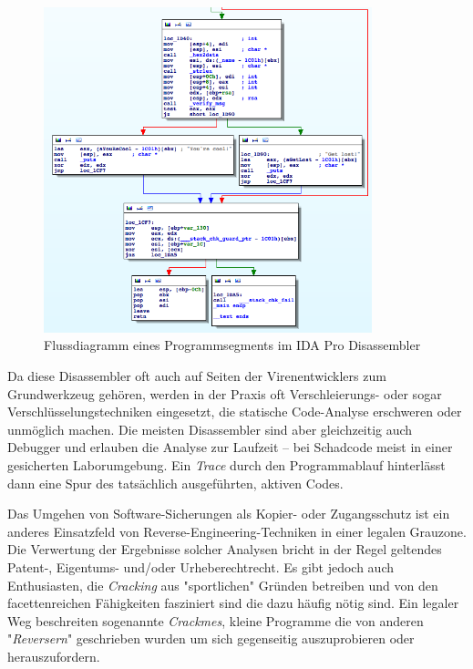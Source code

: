 \begin{figure}[h]
  \begin{center}
	\includegraphics[width=0.85\textwidth]{IDA-pro-flowdiagram.png}
  \end{center}
  \caption{Flussdiagramm eines Programmsegments im IDA Pro Disassembler}
\end{figure}

Da diese Disassembler oft auch auf Seiten der Virenentwicklers zum Grundwerkzeug gehören, werden in der Praxis oft Verschleierungs- oder sogar Verschlüsselungstechniken eingesetzt, die statische Code-Analyse erschweren oder unmöglich machen. Die meisten Disassembler sind aber gleichzeitig auch Debugger und erlauben die Analyse zur Laufzeit – bei Schadcode meist in einer gesicherten Laborumgebung. Ein \emph{Trace} durch den Programmablauf hinterlässt dann eine Spur des tatsächlich ausgeführten, aktiven Codes.

Das Umgehen von Software-Sicherungen als Kopier- oder Zugangsschutz ist ein anderes Einsatzfeld von Reverse-Engineering-Techniken in einer legalen Grauzone. Die Verwertung  der Ergebnisse solcher Analysen bricht in der Regel geltendes Patent-, Eigentums- und/oder Urheberechtrecht. Es gibt jedoch auch Enthusiasten, die \emph{Cracking} aus "sportlichen" Gründen betreiben und von den facettenreichen Fähigkeiten fasziniert sind die dazu häufig nötig sind. Ein legaler Weg beschreiten sogenannte \emph{Crackmes}\cite{crackme}, kleine Programme die von anderen "\emph{Reversern}" geschrieben wurden um sich gegenseitig auszuprobieren oder herauszufordern.


